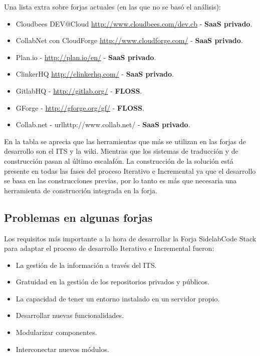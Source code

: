 \newpage

\par Una lista extra sobre forjas actuales (en las que no se basó el análisis):

\begin{itemize}
	\item Cloudbees DEV@Cloud \url{http://www.cloudbees.com/dev.cb} - \textbf{SaaS privado}.
	\item CollabNet con CloudForge \url{http://www.cloudforge.com/} - \textbf{SaaS privado}.
	\item Plan.io - \url{http://plan.io/en/} - \textbf{SaaS privado}.
	\item ClinkerHQ \url{http://clinkerhq.com/} - \textbf{SaaS privado}.
    \item GitlabHQ - \url{http://gitlab.org/} - \textbf{FLOSS}.
	\item GForge - \url{http://gforge.org/gf/} - \textbf{FLOSS}.
	\item Collab.net - url{http://www.collab.net/} - \textbf{SaaS privado}.
\end{itemize}

\par En la tabla se aprecia que las herramientas que más se utilizan en las forjas de desarrollo son el ITS y la wiki. Mientras que los sistemas de traducción y de construcción pasan al último escalafón. La construcción de la solución está presente en todas las fases del proceso Iterativo e Incremental ya que el desarrollo se basa en las construcciones previas, por lo tanto es más que necesaria una herramienta de construcción integrada en la forja.


\subsection{Problemas en algunas forjas}
\label{sub:problemas}

\par Los requisitos más importante a la hora de desarrollar la Forja SidelabCode Stack para adaptar el proceso de desarrollo Iterativo e Incremental fueron:

\begin{itemize}
	\item La gestión de la información a través del ITS.
    \item Gratuidad en la gestión de los repositorios privados y públicos.
    \item La capacidad de tener un entorno instalado en un servidor propio.
    \item Desarrollar nuevas funcionalidades.
    \item Modularizar componentes.
    \item Interconectar nuevos módulos.
\end{itemize}


